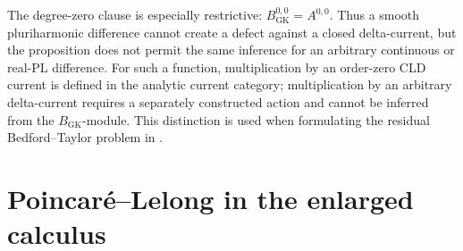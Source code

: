 



The degree-zero clause is especially restrictive:
$B_{\mathrm{GK}}^{0,0}=A^{0,0}$.  Thus a smooth pluriharmonic difference
cannot create a defect against a closed delta-current, but the proposition
does not permit the same inference for an arbitrary continuous or real-PL
difference.  For such a function, multiplication by an order-zero CLD
current is defined in the analytic current category; multiplication by an
arbitrary delta-current requires a separately constructed action and cannot
be inferred from the $B_{\mathrm{GK}}$-module.  This distinction is used
when formulating the residual Bedford--Taylor problem in
.

\section{Poincar\'e--Lelong in the enlarged calculus}
\label{sec:ch18-delta-pl}


